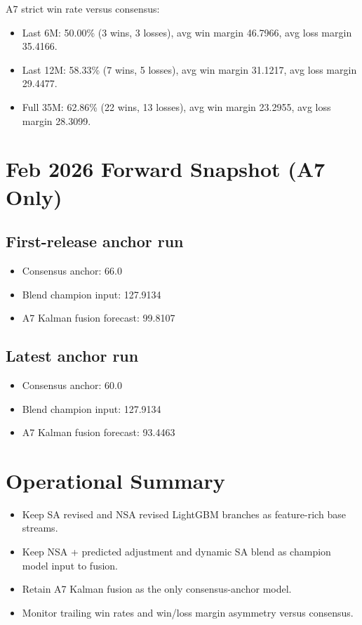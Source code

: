 \documentclass[11pt]{article}
\begin{document}
A7 strict win rate versus consensus:
\begin{itemize}
    \item Last 6M: 50.00\% (3 wins, 3 losses), avg win margin 46.7966, avg loss margin 35.4166.
    \item Last 12M: 58.33\% (7 wins, 5 losses), avg win margin 31.1217, avg loss margin 29.4477.
    \item Full 35M: 62.86\% (22 wins, 13 losses), avg win margin 23.2955, avg loss margin 28.3099.
\end{itemize}

\section{Feb 2026 Forward Snapshot (A7 Only)}
\subsection{First-release anchor run}
\begin{itemize}
    \item Consensus anchor: 66.0
    \item Blend champion input: 127.9134
    \item A7 Kalman fusion forecast: 99.8107
\end{itemize}

\subsection{Latest anchor run}
\begin{itemize}
    \item Consensus anchor: 60.0
    \item Blend champion input: 127.9134
    \item A7 Kalman fusion forecast: 93.4463
\end{itemize}

\section{Operational Summary}
\begin{itemize}
    \item Keep SA revised and NSA revised LightGBM branches as feature-rich base streams.
    \item Keep NSA + predicted adjustment and dynamic SA blend as champion model input to fusion.
    \item Retain A7 Kalman fusion as the only consensus-anchor model.
    \item Monitor trailing win rates and win/loss margin asymmetry versus consensus.
\end{itemize}
\end{document}
